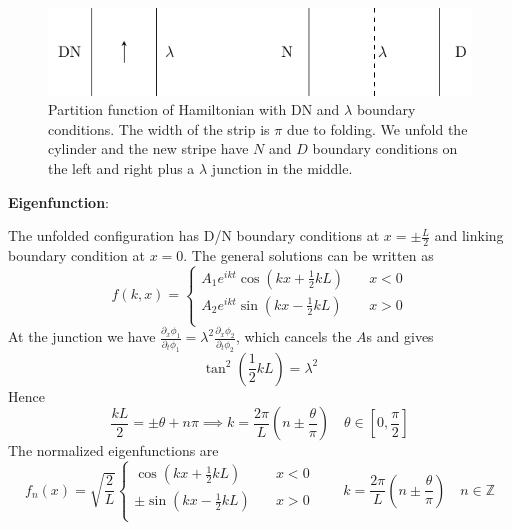 \documentclass{article}
\begin{document}
\begin{figure}[h]
\centering
\includegraphics[width=\textwidth]{fig_DN-lambda-gnd}
\caption{Partition function of Hamiltonian with DN and $\lambda$ boundary conditions. The width of the strip is $\pi$ due to folding. We unfold the cylinder and the new stripe have $N$ and $D$ boundary conditions on the left and right plus a $\lambda$ junction in the middle. }
\label{fig:DN-lambda-gnd}
\end{figure}

{\bf Eigenfunction}: 

The unfolded configuration has D/N boundary conditions at $x = \pm \frac{L}{2}$ and linking boundary condition at $x = 0$. The general solutions can be written as
\begin{equation}
f(k, x) = 
\left\lbrace
\begin{aligned}
  A_1 e^{i kt} \cos(kx +\frac{1}{2}kL ) &  \quad x < 0  \\
  A_2 e^{ikt}  \sin(kx - \frac{1}{2}kL ) & \quad x > 0   \\
\end{aligned} \right. 
\end{equation}
At the junction we have $\frac{\partial_x \phi_1}{ \partial_t \phi_1} = \lambda^2 \frac{\partial_x \phi_2}{ \partial_t \phi_2}$, which cancels the $A$s and gives
\begin{equation}
\tan ^2 (\frac{1}{2} kL ) = \lambda^2 
\end{equation}
Hence
\begin{equation}
 \frac{kL}{2} = \pm \theta + n \pi \implies  k = \frac{2\pi}{L}( n \pm \frac{\theta}{\pi} )  \quad \theta \in [0,\frac{\pi}{2} ]  
\end{equation}
The normalized eigenfunctions are
\begin{equation}
f_n(x) = \sqrt{\frac{2}{L}}
\left\lbrace
\begin{aligned}
  \cos(kx +\frac{1}{2}kL ) &  \quad x < 0  \\
  \pm \sin(kx - \frac{1}{2}kL ) & \quad x > 0   \\
\end{aligned} \right. 
\qquad 
k = \frac{2\pi}{L}( n \pm  \frac{\theta}{\pi} )  \quad n \in \mathbb{Z} 
\end{equation}
\end{document}

